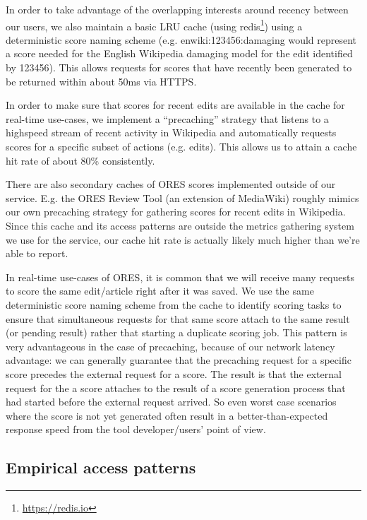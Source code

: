 In order to take advantage of the overlapping interests around recency between our users, we also maintain a basic LRU cache (using redis\footnote{\url{https://redis.io}}) using a deterministic score naming scheme (e.g. enwiki:123456:damaging would represent a score needed for the English Wikipedia damaging model for the edit identified by 123456).  This allows requests for scores that have recently been generated to be returned within about 50ms via HTTPS.

In order to make sure that scores for recent edits are available in the cache for real-time use-cases, we implement a ``precaching'' strategy that listens to a highspeed stream of recent activity in Wikipedia and automatically requests scores for a specific subset of actions (e.g. edits).  This allows us to attain a cache hit rate of about 80\% consistently.

There are also secondary caches of ORES scores implemented outside of our service.  E.g. the ORES Review Tool (an extension of MediaWiki) roughly mimics our own precaching strategy for gathering scores for recent edits in Wikipedia.  Since this cache and its access patterns are outside the metrics gathering system we use for the service, our cache hit rate is actually likely much higher than we're able to report.

In real-time use-cases of ORES, it is common that we will receive many requests to score the same edit/article right after it was saved.  We use the same deterministic score naming scheme from the cache to identify scoring tasks to ensure that simultaneous requests for that same score attach to the same result (or pending result) rather that starting a duplicate scoring job.  This pattern is very advantageous in the case of precaching, because of our network latency advantage: we can generally guarantee that the precaching request for a specific score precedes the external request for a score.  The result is that the external request for the a score attaches to the result of a score generation process that had started before the external request arrived.  So even worst case scenarios where the score is not yet generated often result in a better-than-expected response speed from the tool developer/users' point of view.

\subsection{Empirical access patterns}



